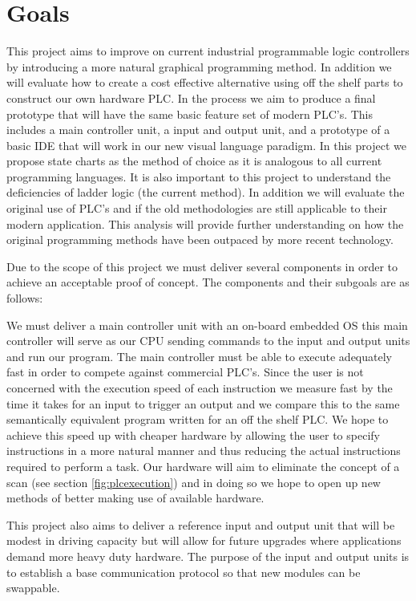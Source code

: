 \section{Goals}

This project aims to improve on current industrial programmable logic controllers by introducing a more natural graphical programming method. In addition we will evaluate how to create a cost effective alternative using off the shelf parts to construct our own hardware PLC. In the process we aim to produce a final prototype that will have the same basic feature set of modern PLC's. This includes a main controller unit, a input and output unit, and a prototype of a basic IDE that will work in our new visual language paradigm. In this project we propose state charts as the method of choice as it is analogous to all current programming languages. It is also important to this project to understand the deficiencies of ladder logic (the current method). In addition we will evaluate the original use of PLC's and if the old methodologies are still applicable to their modern application. This analysis will provide further understanding on how the original programming methods have been outpaced by more recent technology.

Due to the scope of this project we must deliver several components in order to achieve an acceptable proof of concept. The components and their subgoals are as follows:

We must deliver a main controller unit with an on-board embedded OS this main controller will serve as our CPU sending commands to the input and output units and run our program. The main controller must be able to execute adequately fast in order to compete against commercial PLC's. Since the user is not concerned with the execution speed of each instruction we measure fast by the time it takes for an input to trigger an output and we compare this to the same semantically equivalent program written for an off the shelf PLC. We hope to achieve this speed up with cheaper hardware by allowing the user to specify instructions in a more natural manner and thus reducing the actual instructions required to perform a task. Our hardware will aim to eliminate the concept of a scan (see section \ref{fig:plcexecution}) and in doing so we hope to open up new methods of better making use of available hardware.

This project also aims to deliver a reference input and output unit that will be modest in driving capacity but will allow for future upgrades where applications demand more heavy duty hardware. The purpose of the input and output units is to establish a base communication protocol so that new modules can be swappable.

